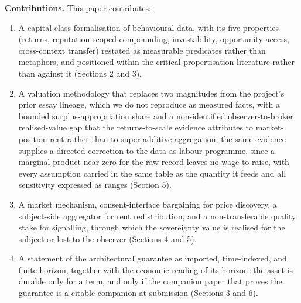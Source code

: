 \documentclass[
  11pt,
]{article}
\providecommand{\tightlist}{%
  \setlength{\itemsep}{0pt}\setlength{\parskip}{0pt}}
\begin{document}
\textbf{Contributions.} This paper contributes:

\begin{enumerate}
\def\labelenumi{\arabic{enumi}.}
\tightlist
\item
  A capital-class formalisation of behavioural data, with its five
  properties (returns, reputation-scoped compounding, investability,
  opportunity access, cross-context transfer) restated as measurable
  predicates rather than metaphors, and positioned within the critical
  propertisation literature rather than against it (Sections 2 and 3).
\item
  A valuation methodology that replaces two magnitudes from the
  project's prior essay lineage, which we do not reproduce as measured
  facts, with a bounded surplus-appropriation share and a non-identified
  observer-to-broker realised-value gap that the returns-to-scale
  evidence attributes to market-position rent rather than to
  super-additive aggregation; the same evidence supplies a directed
  correction to the data-as-labour programme, since a marginal product
  near zero for the raw record leaves no wage to raise, with every
  assumption carried in the same table as the quantity it feeds and all
  sensitivity expressed as ranges (Section 5).
\item
  A market mechanism, consent-interface bargaining for price discovery,
  a subject-side aggregator for rent redistribution, and a
  non-transferable quality stake for signalling, through which the
  sovereignty value is realised for the subject or lost to the observer
  (Sections 4 and 5).
\item
  A statement of the architectural guarantee as imported, time-indexed,
  and finite-horizon, together with the economic reading of its horizon:
  the asset is durable only for a term, and only if the companion paper
  that proves the guarantee is a citable companion at submission
  (Sections 3 and 6).
\end{enumerate}
\end{document}

